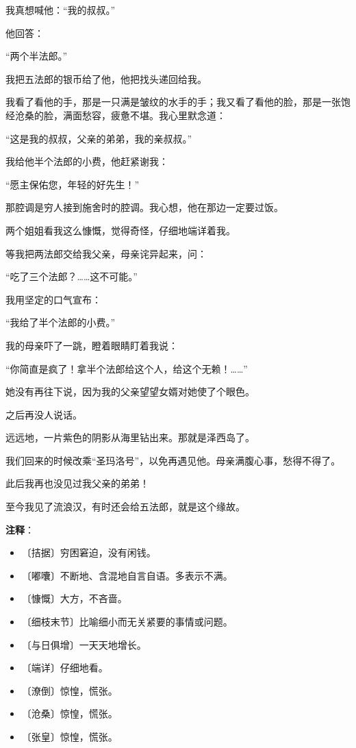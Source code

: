 \documentclass[12pt,UTF-8,openany]{ctexbook}
\begin{document}
\begin{normalsize}
    我真想喊他：“我的叔叔。”
    
    他回答：
    
    “两个半法郎。”
    
    我把五法郎的银币给了他，他把找头递回给我。
    
    我看了看他的手，那是一只满是皱纹的水手的手；我又看了看他的脸，那是一张饱经沧桑的脸，满面愁容，疲惫不堪。我心里默念道：
    
    “这是我的叔叔，父亲的弟弟，我的亲叔叔。”
    
    我给他半个法郎的小费，他赶紧谢我：
    
    “愿主保佑您，年轻的好先生！”
    
    那腔调是穷人接到施舍时的腔调。我心想，他在那边一定要过饭。
    
    两个姐姐看我这么慷慨，觉得奇怪，仔细地端详着我。
    
    等我把两法郎交给我父亲，母亲诧异起来，问：
    
    “吃了三个法郎？……这不可能。”
    
    我用坚定的口气宣布：
    
    “我给了半个法郎的小费。”
    
    我的母亲吓了一跳，瞪着眼睛盯着我说：
    
    “你简直是疯了！拿半个法郎给这个人，给这个无赖！……”
    
    她没有再往下说，因为我的父亲望望女婿对她使了个眼色。
    
    之后再没人说话。
    
    远远地，一片紫色的阴影从海里钻出来。那就是泽西岛了。
    
    我们回来的时候改乘“圣玛洛号”，以免再遇见他。母亲满腹心事，愁得不得了。
    
    此后我再也没见过我父亲的弟弟！
    
    至今我见了流浪汉，有时还会给五法郎，就是这个缘故。
    
\end{normalsize}


\newpage

\textbf{注释}：

\vspace{-1em}

\begin{itemize}
    \setlength\itemsep{-0.2em}
    \item 〔拮据〕穷困窘迫，没有闲钱。
    \item 〔嘟囔〕不断地、含混地自言自语。多表示不满。
    \item 〔慷慨〕大方，不吝啬。
    \item 〔细枝末节〕比喻细小而无关紧要的事情或问题。
    \item 〔与日俱增〕一天天地增长。
    \item 〔端详〕仔细地看。
    \item 〔潦倒〕惊惶，慌张。
    \item 〔沧桑〕惊惶，慌张。
    \item 〔张皇〕惊惶，慌张。
\end{itemize}
\end{document}
